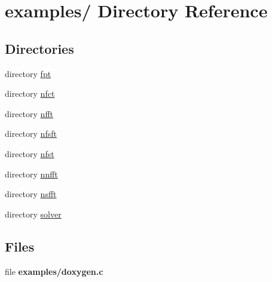 \hypertarget{dir_000000}{
\section{examples/ Directory Reference}
\label{dir_000000}
}
\subsection*{Directories}
\begin{CompactItemize}
\item 
directory \hyperlink{dir_000030}{fpt}
\item 
directory \hyperlink{dir_000020}{nfct}
\item 
directory \hyperlink{dir_000018}{nfft}
\item 
directory \hyperlink{dir_000031}{nfsft}
\item 
directory \hyperlink{dir_000032}{nfst}
\item 
directory \hyperlink{dir_000001}{nnfft}
\item 
directory \hyperlink{dir_000029}{nsfft}
\item 
directory \hyperlink{dir_000010}{solver}
\end{CompactItemize}
\subsection*{Files}
\begin{CompactItemize}
\item 
file {\bf examples/doxygen.c}
\end{CompactItemize}
